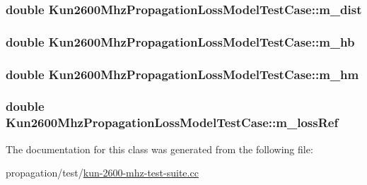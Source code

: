 \subsubsection[{\texorpdfstring{m\+\_\+dist}{m_dist}}]{\setlength{\rightskip}{0pt plus 5cm}double Kun2600\+Mhz\+Propagation\+Loss\+Model\+Test\+Case\+::m\+\_\+dist\hspace{0.3cm}{\ttfamily [private]}}\hypertarget{classKun2600MhzPropagationLossModelTestCase_aa48e852a4db7a04367049e2fb7877db8}{}\label{classKun2600MhzPropagationLossModelTestCase_aa48e852a4db7a04367049e2fb7877db8}
\subsubsection[{\texorpdfstring{m\+\_\+hb}{m_hb}}]{\setlength{\rightskip}{0pt plus 5cm}double Kun2600\+Mhz\+Propagation\+Loss\+Model\+Test\+Case\+::m\+\_\+hb\hspace{0.3cm}{\ttfamily [private]}}\hypertarget{classKun2600MhzPropagationLossModelTestCase_a70321e779e39cca996a1bfcdd46b72a6}{}\label{classKun2600MhzPropagationLossModelTestCase_a70321e779e39cca996a1bfcdd46b72a6}
\subsubsection[{\texorpdfstring{m\+\_\+hm}{m_hm}}]{\setlength{\rightskip}{0pt plus 5cm}double Kun2600\+Mhz\+Propagation\+Loss\+Model\+Test\+Case\+::m\+\_\+hm\hspace{0.3cm}{\ttfamily [private]}}\hypertarget{classKun2600MhzPropagationLossModelTestCase_a60a374a3ca4a03f1e85b4fe2574aeebc}{}\label{classKun2600MhzPropagationLossModelTestCase_a60a374a3ca4a03f1e85b4fe2574aeebc}
\subsubsection[{\texorpdfstring{m\+\_\+loss\+Ref}{m_lossRef}}]{\setlength{\rightskip}{0pt plus 5cm}double Kun2600\+Mhz\+Propagation\+Loss\+Model\+Test\+Case\+::m\+\_\+loss\+Ref\hspace{0.3cm}{\ttfamily [private]}}\hypertarget{classKun2600MhzPropagationLossModelTestCase_acd258e14ea3b997fa29dae29e1c2b2fb}{}\label{classKun2600MhzPropagationLossModelTestCase_acd258e14ea3b997fa29dae29e1c2b2fb}


The documentation for this class was generated from the following file\+:\begin{DoxyCompactItemize}
\item 
propagation/test/\hyperlink{kun-2600-mhz-test-suite_8cc}{kun-\/2600-\/mhz-\/test-\/suite.\+cc}\end{DoxyCompactItemize}
